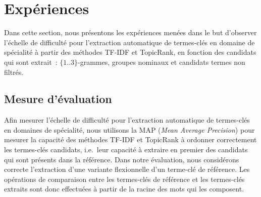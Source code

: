 \section{Expériences}
\label{sec:experiences}
  Dans cette section, nous présentons les expériences menées dans le but
  d'observer l'échelle de difficulté pour l'extraction automatique de
  termes-clés en domaine de spécialité à partir des méthodes TF-IDF et
  TopicRank, en fonction des candidats qui sont extrait~: $\{1..3\}$-grammes,
  groupes nominaux et candidats termes non filtrés.

  \subsection{Mesure d'évaluation}
  \label{subsec:mesure_d_evaluation}
    Afin mesurer l'échelle de difficulté pour l'extraction automatique de
    termes-clés en domaines de spécialité, nous utilisons la MAP (\textit{Mean
    Average Precision}) pour mesurer la capacité des méthodes TF-IDF et
    TopicRank à ordonner correctement les termes-clés candidats, i.e.~leur
    capacité à extraire en premier des candidats qui sont présents dans la
    référence. Dans notre évaluation, nous considérons correcte l'extraction
    d'une variante flexionnelle d'un terme-clé de référence. Les opérations de
    comparaison entre les termes-clés de référence et les termes-clés extraits
    sont donc effectuées à partir de la racine des mots qui les composent.

